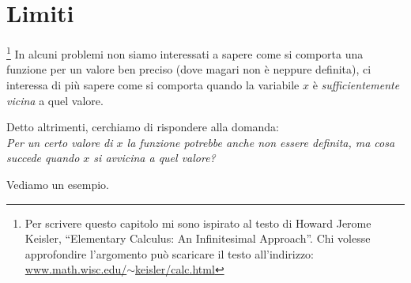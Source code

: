 \section{Limiti}
\label{sec:cont_limiti}

\footnote{Per scrivere questo capitolo mi sono ispirato 
al testo di Howard Jerome Keisler, 
``Elementary Calculus: An Infinitesimal Approach''. 
Chi volesse approfondire l'argomento può scaricare il testo all'indirizzo: 
\href{https://www.math.wisc.edu/~keisler/calc.html}
     {www.math.wisc.edu/\(\sim\)keisler/calc.html}}
In alcuni problemi non siamo interessati a sapere come si comporta una 
funzione per un valore ben preciso (dove magari non è neppure definita), ci 
interessa di più sapere come si comporta quando la variabile \(x\) è 
\emph{sufficientemente vicina} a quel valore.

Detto altrimenti, cerchiamo di rispondere alla domanda: \\
\emph{Per un certo valore di \(x\) la funzione potrebbe anche \emph{non} 
essere definita, ma cosa succede quando \(x\) si avvicina a quel valore?}

Vediamo un esempio.

